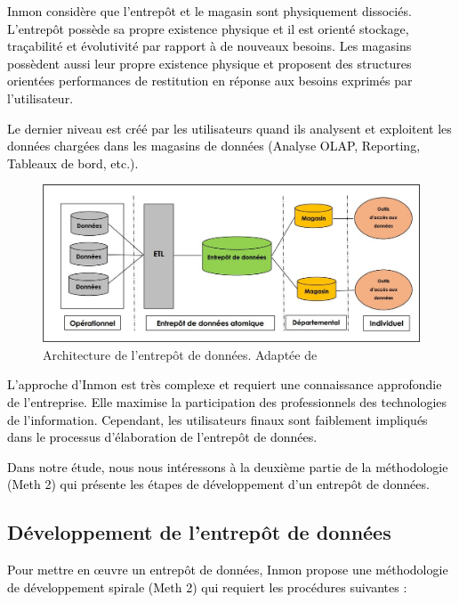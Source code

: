 \documentclass[a4paper,12pt]{report}
\begin{document}
\textcolor{black}{Inmon considère que l’entrepôt et le magasin sont physiquement dissociés. L’entrepôt possède sa propre existence physique et il est orienté stockage, traçabilité et évolutivité par rapport à de nouveaux besoins. Les magasins possèdent aussi leur propre existence physique et proposent des structures orientées performances de restitution en réponse aux besoins exprimés par l’utilisateur.}

\textcolor{black}{Le dernier niveau est créé par les utilisateurs quand ils analysent et exploitent les données chargées dans les magasins de données (Analyse OLAP, Reporting, Tableaux de bord, etc.).}



\begin{figure}[H]
\begin{center}
\includegraphics[width=1\linewidth]{./images/2}
\end{center}
\caption{Architecture de l’entrepôt de données. Adaptée de \citep{weir2008}}
\label{fig:2}
\end{figure}




\textcolor{black}{
L’approche d’Inmon est très complexe et requiert une connaissance approfondie de l’entreprise. Elle maximise la participation des professionnels des technologies de l’information. Cependant, les utilisateurs finaux sont faiblement impliqués dans le processus d’élaboration de l’entrepôt de données.}

\textcolor{black}{Dans notre étude, nous nous intéressons à la deuxième partie de la méthodologie (Meth 2) qui présente les étapes de développement d’un entrepôt de données.}


\subsection{Développement de l’entrepôt de données}

\textcolor{black}{Pour mettre en œuvre un entrepôt de données, Inmon propose une méthodologie de développement spirale (Meth 2) qui requiert les procédures suivantes :}
\end{document}
